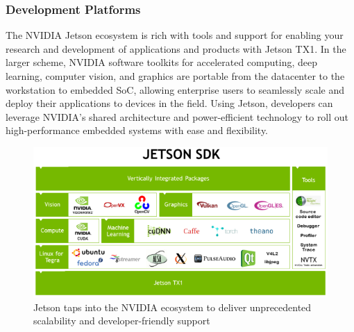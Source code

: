         \subsubsection{Development Platforms}
            The NVIDIA Jetson ecosystem is rich with tools and support for enabling your research and development of applications and products with Jetson TX1. In the larger scheme, NVIDIA software toolkits for accelerated computing, deep learning, computer vision, 
            and graphics are portable from the datacenter to the workstation to embedded SoC, allowing enterprise users to seamlessly scale and deploy their applications to devices in the field. Using Jetson, developers can leverage NVIDIA’s shared architecture and 
            power-efficient technology to roll out high-performance embedded systems with ease and flexibility.
            \begin{figure}
                \centering
                \includegraphics[width=0.6\linewidth]{img/jetson-sdk.png}
                \caption{Jetson taps into the NVIDIA ecosystem to deliver unprecedented scalability and developer-friendly support}
            \end{figure}
